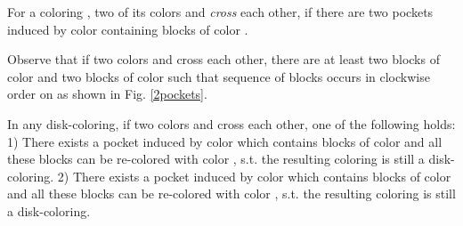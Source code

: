 \documentclass{llncs}
\begin{document}
\vspace{-25pt}




\begin{definition}
For a coloring , two of its colors  and  \emph{cross} each other, if there are two pockets induced by color  containing blocks of color .
\end{definition}

Observe that if two colors  and  cross each other, there are at least two blocks  of color  and two blocks  of color  such that sequence of blocks  occurs in clockwise order on  as shown in Fig. \ref{2pockets}.

\begin{lemma}
In any disk-coloring, if two colors  and  cross each other, one of the following holds: 1) There exists a pocket induced by color  which contains blocks of color  and all these blocks can be re-colored with color , s.t. the resulting coloring is still a disk-coloring. 2) There exists a pocket induced by color  which contains blocks of color  and all these blocks can  be re-colored with color , s.t. the resulting coloring is still a disk-coloring.
\label{crossLem}
\end{lemma}
\end{document}

